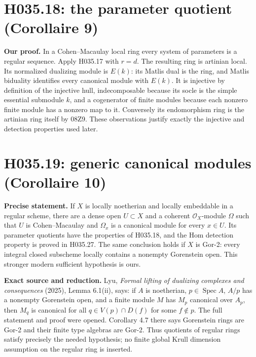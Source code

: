 \section{H035.18: the parameter quotient (Corollaire 9)}
\textbf{Our proof.} In a Cohen--Macaulay local ring every system of
parameters is a regular sequence. Apply H035.17 with $r=d$.
The resulting ring is artinian local. Its normalized dualizing module
is $E(k)$: its Matlis dual is the ring, and Matlis biduality identifies
every canonical module with $E(k)$. It is injective by definition of
the injective hull, indecomposable because its socle is the simple
essential submodule $k$, and a cogenerator of finite modules because
each nonzero finite module has a nonzero map to it. Conversely its
endomorphism ring is the artinian ring itself by 08Z9. These observations
justify exactly the injective and detection properties used later.

\section{H035.19: generic canonical modules (Corollaire 10)}
\textbf{Precise statement.} If $X$ is locally noetherian and locally
embeddable in a regular scheme, there are a dense open $U\subset X$
and a coherent $\mathcal O_X$-module $\Omega$ such that $U$ is
Cohen--Macaulay and $\Omega_x$ is a canonical module for every $x\in U$.
Its parameter quotients have the properties of H035.18, and the Hom
detection property is proved in H035.27. The same conclusion holds if
$X$ is Gor-2: every integral closed subscheme locally contains a nonempty
Gorenstein open. This stronger modern sufficient hypothesis is ours.

\textbf{Exact source and reduction.} Lyu, \emph{Formal lifting of
dualizing complexes and consequences} (2025), Lemma 6.1(ii), says:
if $A$ is noetherian, $p\in\operatorname{Spec}A$, $A/p$ has a
nonempty Gorenstein open, and a finite module $M$ has $M_p$ canonical
over $A_p$, then $M_q$ is canonical for all
$q\in V(p)\cap D(f)$ for some $f\notin p$. The full statement and
proof were opened. Corollary 4.7 there says Gorenstein rings are Gor-2
and their finite type algebras are Gor-2. Thus quotients of regular
rings satisfy precisely the needed hypothesis; no finite global Krull
dimension assumption on the regular ring is inserted.

